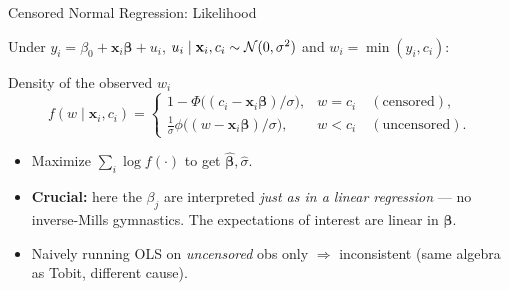 \documentclass[aspectratio=169, 12pt]{beamer}
\newcommand{\xib}{\mathbf{x}_i\boldsymbol{\beta}}    %
\begin{document}
\begin{frame}[shrink=8]{Censored Normal Regression: Likelihood}

  Under $y_i = \beta_0 + \xib + u_i$, $u_i\mid\mathbf{x}_i,c_i \sim \mathcal{N}(0,\sigma^2)$
  and $w_i=\min(y_i,c_i)$:

  \begin{definitionbox}{Density of the observed $w_i$}
    \[
      f(w\mid\mathbf{x}_i,c_i) =
      \begin{cases}
        1 - \Phi\!\big((c_i - \xib)/\sigma\big), & w = c_i \quad(\text{censored}),\\[4pt]
        \tfrac{1}{\sigma}\phi\!\big((w - \xib)/\sigma\big), & w < c_i \quad(\text{uncensored}).
      \end{cases}
    \]
  \end{definitionbox}

  \smallskip

  \begin{keybox}
    \begin{itemize}
      \item Maximize $\sum_i \log f(\cdot)$ to get $\hat{\boldsymbol\beta},\hat\sigma$.
      \item \textbf{Crucial:} here the $\beta_j$ are interpreted \emph{just as in a
        linear regression} --- no inverse-Mills gymnastics. The expectations of
        interest are linear in $\boldsymbol\beta$.
      \item Naively running OLS on \emph{uncensored} obs only $\Rightarrow$
        inconsistent (same algebra as Tobit, different cause).
    \end{itemize}
  \end{keybox}

\end{frame}
\end{document}
